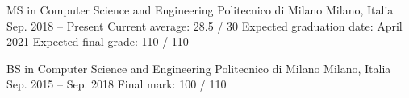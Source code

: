 

\begin{cventries}

\cventry
    {MS in Computer Science and Engineering}
    {Politecnico di Milano}
    {Milano, Italia}
    {Sep. 2018 -- Present}
    {Current average: 28.5 / 30 {\enskip\cdotp\enskip} Expected graduation date: April 2021 {\enskip\cdotp\enskip} Expected final grade: 110 / 110}
    
\cventry
    {BS in Computer Science and Engineering}
    {Politecnico di Milano}
    {Milano, Italia}
    {Sep. 2015 -- Sep. 2018}
    {Final mark: 100 / 110}
    
\end{cventries}
